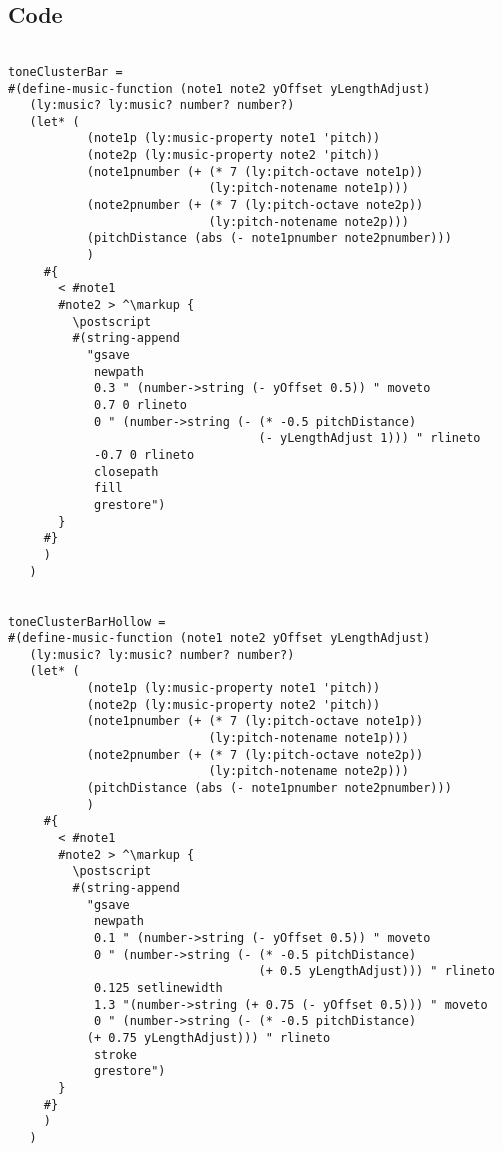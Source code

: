 \documentclass[11pt, oneside]{book}   	%
\begin{document}
\subsection{Code}
\begin{verbatim}

toneClusterBar =
#(define-music-function (note1 note2 yOffset yLengthAdjust)
   (ly:music? ly:music? number? number?)
   (let* (
           (note1p (ly:music-property note1 'pitch))
           (note2p (ly:music-property note2 'pitch))
           (note1pnumber (+ (* 7 (ly:pitch-octave note1p))
                            (ly:pitch-notename note1p)))
           (note2pnumber (+ (* 7 (ly:pitch-octave note2p))
                            (ly:pitch-notename note2p)))
           (pitchDistance (abs (- note1pnumber note2pnumber)))
           )
     #{
       < #note1
       #note2 > ^\markup {
         \postscript
         #(string-append
           "gsave
            newpath
            0.3 " (number->string (- yOffset 0.5)) " moveto
            0.7 0 rlineto
            0 " (number->string (- (* -0.5 pitchDistance)
                                   (- yLengthAdjust 1))) " rlineto
            -0.7 0 rlineto
            closepath
            fill
            grestore")
       }
     #}
     )
   )


toneClusterBarHollow =
#(define-music-function (note1 note2 yOffset yLengthAdjust)
   (ly:music? ly:music? number? number?)
   (let* (
           (note1p (ly:music-property note1 'pitch))
           (note2p (ly:music-property note2 'pitch))
           (note1pnumber (+ (* 7 (ly:pitch-octave note1p))
                            (ly:pitch-notename note1p)))
           (note2pnumber (+ (* 7 (ly:pitch-octave note2p))
                            (ly:pitch-notename note2p)))
           (pitchDistance (abs (- note1pnumber note2pnumber)))
           )
     #{
       < #note1
       #note2 > ^\markup {
         \postscript
         #(string-append
           "gsave
            newpath
            0.1 " (number->string (- yOffset 0.5)) " moveto
            0 " (number->string (- (* -0.5 pitchDistance)
                                   (+ 0.5 yLengthAdjust))) " rlineto
            0.125 setlinewidth
            1.3 "(number->string (+ 0.75 (- yOffset 0.5))) " moveto
            0 " (number->string (- (* -0.5 pitchDistance)
           (+ 0.75 yLengthAdjust))) " rlineto
            stroke
            grestore")
       }
     #}
     )
   )



\end{verbatim}
\end{document}
